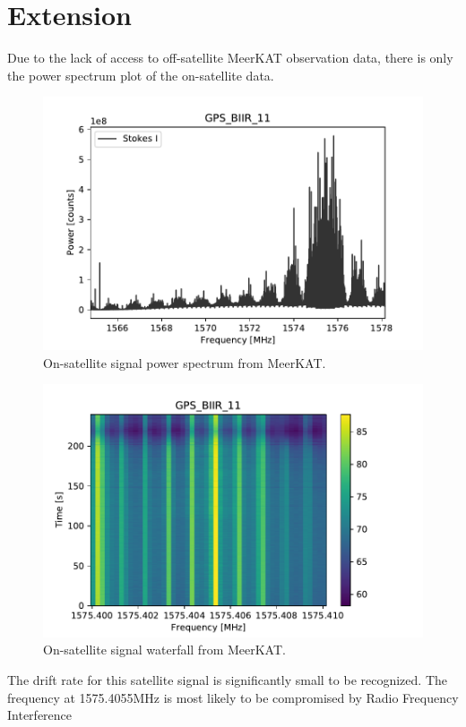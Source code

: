 \documentclass{article}
\begin{document}
\section{Extension}
Due to the lack of access to off-satellite MeerKAT observation data, there is only the power spectrum plot of the on-satellite data.

\begin{figure}[H]
    \centering
    \includegraphics[scale=0.8]{on.pdf}
    \caption{On-satellite signal power spectrum from MeerKAT.}
    \label{fig:3}
\end{figure}

\begin{figure}[H]
    \centering
    \includegraphics[scale=0.8]{on_waterfall.pdf}
    \caption{On-satellite signal waterfall from MeerKAT.}
    \label{fig:4}
\end{figure}

The drift rate for this satellite signal is significantly small to be recognized. The frequency at 1575.4055MHz is most likely to be compromised by Radio Frequency Interference



\end{document}

